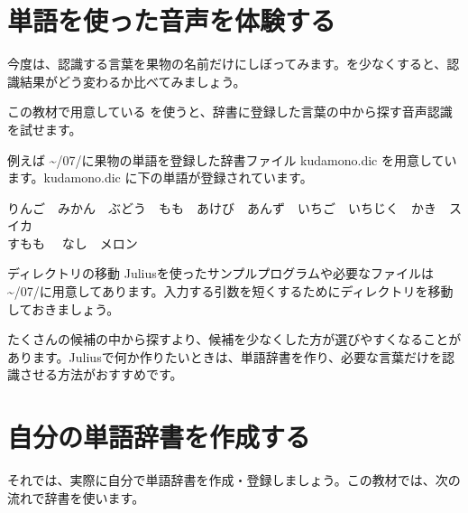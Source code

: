 \documentclass[text06.tex]{subfiles}
\begin{document}
\newpage
\section{単語を使った音声を体験する}
今度は、認識する言葉を果物の名前だけにしぼってみます。を少なくすると、認識結果がどう変わるか比べてみましょう。

この教材で用意している  を使うと、辞書に登録した言葉の中から探す音声認識を試せます。\\

例えば \textasciitilde /07/に果物の単語を登録した辞書ファイル \mbox{kudamono.dic} を用意しています。\mbox{kudamono.dic} に下の単語が登録されています。
\begin{center}
	りんご　みかん　ぶどう　もも　あけび　あんず　いちご　いちじく　かき　スイカ\\すもも　	なし　メロン
\end{center}

\begin{itembox}[c]{ディレクトリの移動}
        Juliusを使ったサンプルプログラムや必要なファイルは \textasciitilde /07/に用意してあります。入力する引数を短くするためにディレクトリを移動しておきましょう。\\
\end{itembox}

\begin{tcolorbox}[title=\useOmetoi]
\begin{enumerate}
\end{enumerate}
\end{tcolorbox}

たくさんの候補の中から探すより、候補を少なくした方が選びやすくなることがあります。Juliusで何か作りたいときは、単語辞書を作り、必要な言葉だけを認識させる方法がおすすめです。

\newpage
\section{自分の単語辞書を作成する}
それでは、実際に自分で単語辞書を作成・登録しましょう。この教材では、次の流れで辞書を使います。
\end{document}
